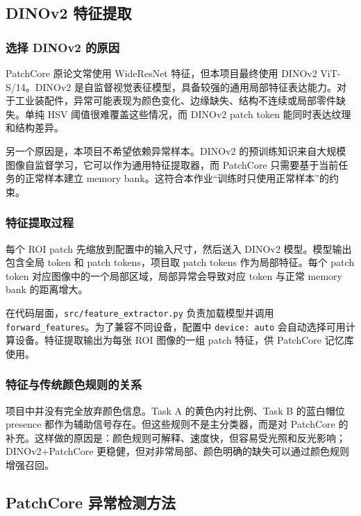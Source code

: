 \documentclass[12pt,hyperref,a4paper,UTF8,fontset=fandol]{ctexart}
\begin{document}
\subsection{DINOv2 特征提取}

\subsubsection{选择 DINOv2 的原因}

PatchCore 原论文常使用 WideResNet 特征，但本项目最终使用 DINOv2 ViT-S/14。DINOv2 是自监督视觉表征模型，具备较强的通用局部特征表达能力。对于工业装配件，异常可能表现为颜色变化、边缘缺失、结构不连续或局部零件缺失。单纯 HSV 阈值很难覆盖这些情况，而 DINOv2 patch token 能同时表达纹理和结构差异。

另一个原因是，本项目不希望依赖异常样本。DINOv2 的预训练知识来自大规模图像自监督学习，它可以作为通用特征提取器，而 PatchCore 只需要基于当前任务的正常样本建立 memory bank。这符合本作业“训练时只使用正常样本”的约束。

\subsubsection{特征提取过程}

每个 ROI patch 先缩放到配置中的输入尺寸，然后送入 DINOv2 模型。模型输出包含全局 token 和 patch tokens，项目取 patch tokens 作为局部特征。每个 patch token 对应图像中的一个局部区域，局部异常会导致对应 token 与正常 memory bank 的距离增大。

在代码层面，\texttt{src/feature\_extractor.py} 负责加载模型并调用 \texttt{forward\_features}。为了兼容不同设备，配置中 \texttt{device: auto} 会自动选择可用计算设备。特征提取输出为每张 ROI 图像的一组 patch 特征，供 PatchCore 记忆库使用。

\subsubsection{特征与传统颜色规则的关系}

项目中并没有完全放弃颜色信息。Task A 的黄色内衬比例、Task B 的蓝白帽位 presence 都作为辅助信号存在。但这些规则不是主分类器，而是对 PatchCore 的补充。这样做的原因是：颜色规则可解释、速度快，但容易受光照和反光影响；DINOv2+PatchCore 更稳健，但对非常局部、颜色明确的缺失可以通过颜色规则增强召回。

\newpage
\subsection{PatchCore 异常检测方法}
\end{document}
